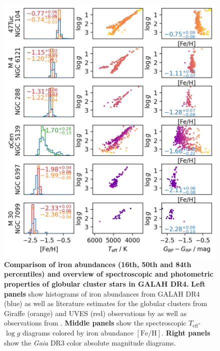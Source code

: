 \documentclass[
  journal=pasa,
  manuscript=research-paper, %
  year=2024,
  volume=37
]{cup-journal}
\newcommand{\Teff}{$T_\mathrm{eff}$\xspace}
\newcommand{\logg}{$\log g$\xspace}
\newcommand{\feh}{$\mathrm{[Fe/H]}$\xspace}
\newcommand{\Gaia}{\textit{Gaia}\xspace}
\begin{document}
\begin{figure}
 \centering
 \includegraphics[width=\columnwidth]{figures/galah_dr4_allstar_globular_cluster_feh_comparison.png}
 \caption{\textbf{Comparison of iron abundances (16th, 50th and 84th percentiles) and overview of spectroscopic and photometric properties of globular cluster stars in GALAH DR4.}
 \textbf{Left panels} show histograms of iron abundances from GALAH DR4 (blue) as well as literature estimates for the globular clusters from Giraffe (orange) and UVES (red) observations by \citep{Carretta2009, Carretta2009c} as well as observations from \cite{Johnson2010}.
 \textbf{Middle panels} show the spectroscopic \Teff-\logg diagrams colored by iron abundance \feh.
 \textbf{Right panels} show the \Gaia DR3 color absolute magnitude diagrams.
}
 \label{fig:galah_dr4_allstar_globular_cluster_feh_comparison}
\end{figure}
\end{document}
